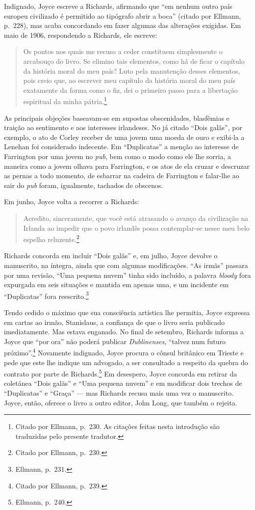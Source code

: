 Indignado, Joyce escreve a Richards, afirmando que “em nenhum outro país europeu
civilizado é permitido ao tipógrafo abrir a boca” (citado por Ellmann, p.~228),
mas acaba concordando em fazer algumas das alterações exigidas. Em maio de
1906, respondendo a Richards, ele escreve: 

\begin{quote}
Os pontos nos quais me recuso a ceder constituem simplesmente o arcabouço do
livro. Se elimino tais elementos, como há de ficar o capítulo da história moral
do meu país? Luto pela manutenção desses elementos, pois creio que, ao escrever
meu capítulo da história moral do meu país exatamente da forma como o fiz, dei
o primeiro passo para a libertação espiritual da minha pátria.\footnote{  Citado por
Ellmann, p.~230. As citações feitas nesta introdução são traduzidas
pelo presente tradutor.}
\end{quote}

As principais objeções baseavam-se em supostas obscenidades, blasfêmias e
traição ao sentimento e aos interesses irlandeses.  No já citado “Dois galãs”,
por exemplo, o ato de Corley receber de uma jovem uma moeda de ouro e exibi-la
a Lenehan foi considerado indecente. Em “Duplicatas” a menção ao interesse de
Farrington por uma jovem no \textit{pub}, bem como o modo como ele lhe sorria,
a maneira como a jovem olhava para Farrington, e os atos de ela cruzar e
descruzar as pernas a todo momento, de esbarrar na cadeira de Farrington e
falar-lhe ao sair do \textit{pub} foram, igualmente, tachados de obscenos.

Em junho, Joyce volta a recorrer a Richards: 

\begin{quote}
Acredito, sinceramente, que você está atrasando o avanço da civilização na Irlanda ao 
impedir que o povo irlandês possa contemplar-se nesse meu belo espelho reluzente.\footnote{ Citado por
Ellmann, p.~230.} 
\end{quote}

Richards concorda em incluir “Dois galãs” e, em julho, Joyce
devolve o manuscrito, na íntegra, ainda que com algumas modificações. “As
irmãs” passara por uma revisão, “Uma pequena nuvem” tinha sido incluído, a
palavra \textit{bloody} fora expurgada em seis situações e mantida em apenas
uma, e um incidente em “Duplicatas” fora reescrito.\footnote{ Ellmann, p.~231.}

Tendo cedido o máximo que sua consciência artística lhe permitia, Joyce expressa
em cartas ao irmão, Stanislaus, a confiança de que o livro seria publicado
imediatamente. Mas estava enganado. No final de setembro, Richards informa a
Joyce que “por ora” não poderá publicar \textit{Dublinenses}, “talvez num futuro
próximo”.\footnote{ Citado por Ellmann, p.~239.} Novamente indignado, Joyce procura o
cônsul britânico em Trieste e pede que este lhe indique um advogado, a ser
consultado a respeito da quebra do contrato por parte de Richards.\footnote{ Ellmann, p.~240.} 
Em desespero, Joyce concorda em retirar da coletânea “Dois galãs” e “Uma
pequena nuvem” e em modificar dois trechos de “Duplicatas” e “Graça” --- mas
Richards recusa mais uma vez o manuscrito. Joyce, então, oferece o livro a
outro editor, John Long, que também o rejeita.

